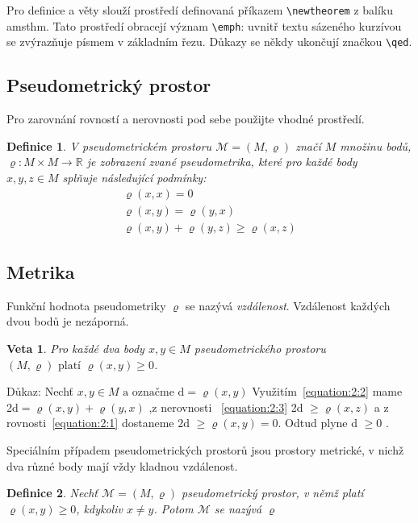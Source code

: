 \documentclass[twocolumn, 11pt, a4paper]{article}
\newtheorem{definice}{Definice}
\newtheorem{veta}{Veta}
\begin{document}
Pro definice a věty slouží prostředí definovaná příkazem \texttt{\textbackslash newtheorem} z balíku amsthm.
Tato prostředí obracejí význam \texttt{\textbackslash emph}:
uvnitř textu sázeného kurzívou se zvýrazňuje písmem v základním řezu.
Důkazy se někdy ukončují značkou \texttt{\textbackslash qed}.
\subsection{Pseudometrický prostor}
Pro zarovnání rovností a nerovnosti pod sebe použijte vhodné prostředí.
\begin{definice}
V pseudometrickém prostoru $\mathcal{M} = (M,\varrho)$ značí $M$ množinu bodů,
$\varrho: M \times M \rightarrow \mathbb{R}$ je zobrazení zvané pseudometrika, které pro každé body $x,y,z \in M$
splňuje následující podmínky:
\setcounter{equation}{0}
\begin{eqnarray}
    \varrho(x,x) = 0 \label{equation:2:1} \\
    \varrho(x,y) = \varrho(y,x)\label{equation:2:2} \\
    \varrho(x,y) + \varrho(y,z) \geq \varrho(x,z) \label{equation:2:3}
\end{eqnarray}
\end{definice}
\subsection{Metrika}
Funkční hodnota pseudometriky $\varrho$ se nazývá \textit{vzdá\-lenost}. Vzdálenost každých dvou bodů je nezáporná.
\begin{veta}\label{veta.1}
    Pro každé dva body $x,y \in M$ pseudometrického prostoru $(M,\varrho)\text{ platí } \varrho(x,y) \geq 0$.
\end{veta}
Důkaz: Nechť $x,y \in M \text{ a označme d} = \varrho(x,y)$ \hbox{Využitím}~\eqref{equation:2:2}  mame 2d$ = \varrho(x,y) + \varrho(y,x)$
,z nerovnosti ~\eqref{equation:2:3} 2d $\geq \varrho(x,z)$ a z rovnosti~\ref{equation:2:1} dostaneme $ \text{2d } \geq \varrho(x,y) = 0$. Odtud plyne d $\geq0$ .

Speciálním případem pseudometrických prostorů jsou prostory metrické,
v nichž dva různé body mají vždy kladnou vzdálenost.
\begin{definice}\label{definice.2}
    Nechť $\mathcal{M} = (M,\varrho)$ pseudometrický prostor, v němž platí $\varrho(x,y) \ge 0$, kdykoliv $x \neq y$.
    Potom $\mathcal{M}$ se nazývá  $\varrho$ 
\end{definice}
\end{document}
